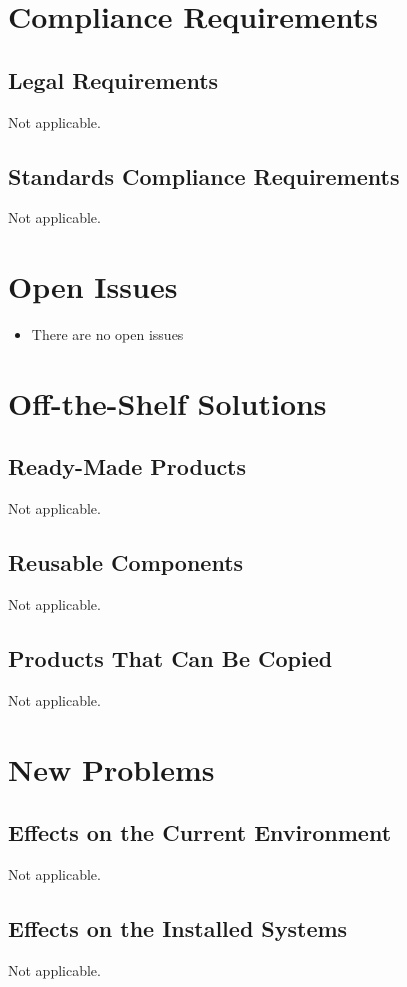 \documentclass[12pt]{article}
\begin{document}
\section{Compliance Requirements}
\subsection{Legal Requirements}
Not applicable.
\subsection{Standards Compliance Requirements}
Not applicable.

\section{Open Issues}

\begin{itemize}

  \item There are no open issues

\end{itemize}

\section{Off-the-Shelf Solutions}
\subsection{Ready-Made Products}
Not applicable.
\subsection{Reusable Components}
Not applicable.
\subsection{Products That Can Be Copied}
Not applicable.

\section{New Problems}
\subsection{Effects on the Current Environment}
Not applicable.
\subsection{Effects on the Installed Systems}
Not applicable.
\end{document}
